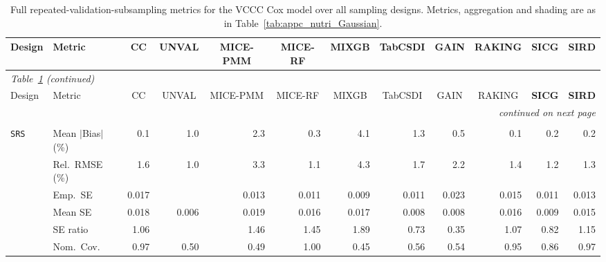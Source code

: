 \begin{landscape}
\footnotesize\setlength{\tabcolsep}{3.5pt}
\begin{longtable}{llrrrrrrrrrr}
\caption{Full repeated-validation-subsampling metrics for the VCCC Cox model over all sampling designs. Metrics, aggregation and shading are as in Table~\ref{tab:appc_nutri_Gaussian}.}
\label{tab:appc_vccc_COX} \\
\toprule
Design & Metric & \multicolumn{1}{c}{CC} & \multicolumn{1}{c}{UNVAL} & \multicolumn{1}{c}{MICE-PMM} & \multicolumn{1}{c}{MICE-RF} & \multicolumn{1}{c}{MIXGB} & \multicolumn{1}{c}{TabCSDI} & \multicolumn{1}{c}{GAIN} & \multicolumn{1}{c}{RAKING} & \multicolumn{1}{c}{\textbf{SICG}} & \multicolumn{1}{c}{\textbf{SIRD}} \\
\midrule
\endfirsthead
\multicolumn{12}{l}{\footnotesize\itshape Table~\ref{tab:appc_vccc_COX} (continued)} \\
\toprule
Design & Metric & \multicolumn{1}{c}{CC} & \multicolumn{1}{c}{UNVAL} & \multicolumn{1}{c}{MICE-PMM} & \multicolumn{1}{c}{MICE-RF} & \multicolumn{1}{c}{MIXGB} & \multicolumn{1}{c}{TabCSDI} & \multicolumn{1}{c}{GAIN} & \multicolumn{1}{c}{RAKING} & \multicolumn{1}{c}{\textbf{SICG}} & \multicolumn{1}{c}{\textbf{SIRD}} \\
\midrule
\endhead
\midrule \multicolumn{12}{r}{\footnotesize\itshape continued on next page} \\
\endfoot
\bottomrule
\endlastfoot
\multicolumn{12}{l}{\textbf{Continuous Phase-Two Covariates}} \\
\addlinespace[2pt]
\quad \texttt{SRS} & Mean $|$Bias$|$ (\%) & \cellcolor{rankone}0.1 & 1.0 & 2.3 & \cellcolor{rankthree}0.3 & 4.1 & 1.3 & 0.5 & \cellcolor{rankone}0.1 & \cellcolor{ranktwo}0.2 & \cellcolor{ranktwo}0.2 \\
 & Rel.\ RMSE (\%) & 1.6 & \cellcolor{rankone}1.0 & 3.3 & \cellcolor{ranktwo}1.1 & 4.3 & 1.7 & 2.2 & 1.4 & \cellcolor{rankthree}1.2 & 1.3 \\
 & Emp.\ SE & 0.017 &  & 0.013 & 0.011 & 0.009 & 0.011 & 0.023 & 0.015 & 0.011 & 0.013 \\
 & Mean SE & 0.018 & 0.006 & 0.019 & 0.016 & 0.017 & 0.008 & 0.008 & 0.016 & 0.009 & 0.015 \\
 & SE ratio & \cellcolor{rankone}1.06 &  & 1.46 & 1.45 & 1.89 & 0.73 & 0.35 & \cellcolor{ranktwo}1.07 & 0.82 & \cellcolor{rankthree}1.15 \\
 & Nom.\ Cov. & \cellcolor{ranktwo}0.97 & 0.50 & 0.49 & \cellcolor{rankthree}1.00 & 0.45 & 0.56 & 0.54 & \cellcolor{rankone}0.95 & 0.86 & \cellcolor{ranktwo}0.97 \\

\end{longtable}
\end{landscape}
